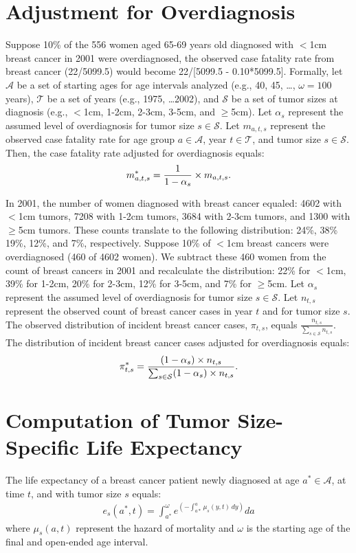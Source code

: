 \documentclass[11pt,letterpaper]{article}
\theoremstyle{plain}
\begin{document}
\section{Adjustment for Overdiagnosis}
Suppose 10\% of the 556 women aged 65-69 years old diagnosed with $<$1cm
breast cancer in 2001 were overdiagnosed, the observed case fatality
rate from breast cancer (22/5099.5) would become 22/[5099.5 -
0.10*5099.5].  Formally, let $\mathcal{A}$ be a set of starting ages
for age intervals analyzed (e.g., 40, 45, \dots, $\omega=100$ years), $\mathcal{T}$ be a set of
years (e.g., 1975, \dots 2002), and $\mathcal{S}$ be a set of tumor
sizes at diagnosis (e.g., $<$1cm, 1-2cm, 2-3cm, 3-5cm, and $\geq$5cm).
Let $\alpha_s$ represent the assumed level of overdiagnosis for tumor
size $s\in\mathcal{S}$.  Let $m_{a,t,s}$ represent the observed case
fatality rate for age group $a \in \mathcal{A}$, year $t \in
\mathcal{T}$, and tumor size $s \in \mathcal{S}$.  Then, the case
fatality rate adjusted for overdiagnosis equals:
\begin{eqnarray}
m^*_{a,t,s}=\frac{1}{1-\alpha_s} \times m_{a,t,s}. \notag
\end{eqnarray}

In 2001, the number of women diagnosed with breast cancer equaled:
4602 with $<$1cm tumors, 7208 with 1-2cm tumors, 3684 with 2-3cm
tumors, and 1300 with $\geq$5cm tumors.  These counts translate to the
following distribution: 24\%, 38\% 19\%, 12\%, and 7\%, respectively.
Suppose 10\% of $<$1cm breast cancers were overdiagnosed (460 of 4602
women).  We subtract these 460 women from the count of breast cancers
in 2001 and recalculate the distribution: 22\% for $<$1cm, 39\% for
1-2cm, 20\% for 2-3cm, 12\% for 3-5cm, and 7\% for $\geq$5cm.  
Let $\alpha_s$ represent the assumed level of overdiagnosis for tumor
size $s\in\mathcal{S}$.  Let $n_{t,s}$ represent the observed count
of breast cancer cases in year $t$ and for tumor size $s$.  The
observed distribution of incident breast cancer cases, $\pi_{t,s}$, equals
$\frac{n_{t,s}}{\sum_{s\in\mathcal{S}}n_{t,s}}$.  The distribution of
incident breast cancer cases adjusted for overdiagnosis equals: 
\begin{eqnarray}
\pi^*_{t,s}=\frac{(1-\alpha_s) \times n_{t,s}}{\sum_{s\in\mathcal{S}}
  (1-\alpha_s) \times n_{t,s}} \notag.
\end{eqnarray} 

\section{Computation of Tumor Size-Specific Life Expectancy}
The life expectancy of a breast cancer patient newly diagnosed at age
$a^*\in\mathcal{A}$, at time $t$, and with tumor size $s$ equals:
\begin{eqnarray}
 e_s(a^*,t)=\int_{a^*}^{\omega} e^{\left( -\int_{a*}^{a}\mu_s(y,t)\,dy \right)}da %
\label{eq:ex.cont}
\end{eqnarray} 
where $\mu_s(a,t)$ %
represent the hazard of mortality
and $\omega$ is the starting age of
the final and open-ended age interval.
\end{document}
